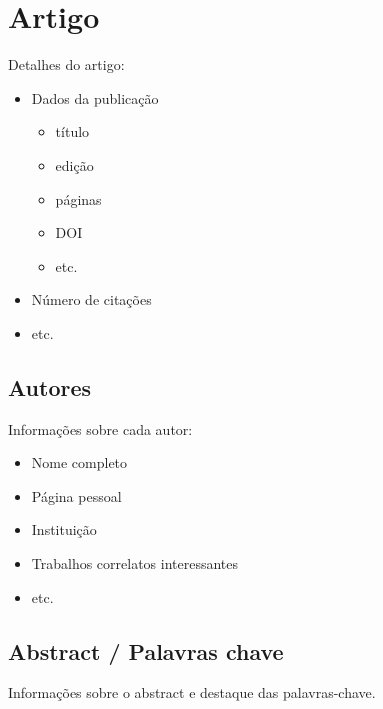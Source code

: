 \documentclass{UnBeamer}%
\begin{document}
    \section{Artigo}%
    \begin{frame}%
        Detalhes do artigo:
        \begin{itemize}
            \item Dados da publicação
            \begin{itemize}%
                \item título%
                \item edição%
                \item páginas%
                \item DOI%
                \item etc.%
            \end{itemize}
            \item Número de citações
            \item etc.
        \end{itemize}
    \end{frame}%

    \subsection{Autores}%
    \begin{frame}%
        Informações sobre cada autor:
        \begin{itemize}
            \item Nome completo
            \item Página pessoal
            \item Instituição
            \item Trabalhos correlatos interessantes
            \item etc.
        \end{itemize}
    \end{frame}%

    \subsection{Abstract / Palavras chave}%
    \begin{frame}%
        Informações sobre o abstract e destaque das palavras-chave.
    \end{frame}%
\end{document}
